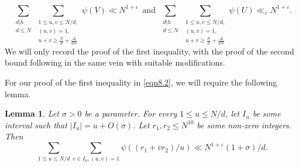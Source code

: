 \documentclass[12pt,reqno]{amsart}
\newtheorem{lemma}[theorem]{Lemma}
\theoremstyle{definition}
\theoremstyle{remark}
\numberwithin{equation}{section}
\renewcommand{\geq}{\geqslant}
\renewcommand{\leq}{\leqslant}
\def\eps{\varepsilon}
\newcommand\1{\mathds{1}}
\begin{document}
\begin{equation} \label{eqn8.2}
\sum_{\substack{d|h \\ d \leqslant N}} \sum_{\substack{1 \leq u,v \leq N/d,\\ (u,v) = 1, \\ u+ v \geq \frac{N}{d} + \frac{\Delta}{dN}}} \psi(V)   \ll N^{1 + \eps} \ \ \text{and} \ \ \sum_{\substack{d|h \\ d \leqslant N}} \sum_{\substack{1 \leq u,v \leq N/d,\\ (u,v) = 1, \\ u+ v \geq \frac{N}{d} + \frac{\Delta}{dN}}} \psi(U) \ll_{\eps} N^{1 + \eps} . 
\end{equation}
We will only record the proof of the first inequality, with the proof of the second bound following in the same vein with suitable modifications.

For our proof of the first inequality in \eqref{eqn8.2}, we will require the following lemma. 

\begin{lemma} \label{lem8.1}
   Let $\sigma >0$ be a parameter. For every $1 \leq u \leq N/d$, let $I_u$ be some interval such that $|I_u| = u + O(\sigma)$. Let $r_1, r_2 \leq N^{10}$ be some non-zero integers. Then 
    \[ \sum_{1 \leq u \leq N/d} \sum_{v \in I_u, (u,v) = 1} \psi((r_1 + \overline{v} r_2)/u) \ll  N^{1 + \eps}(1+ \sigma)/d .  \]
\end{lemma}
\end{document}
